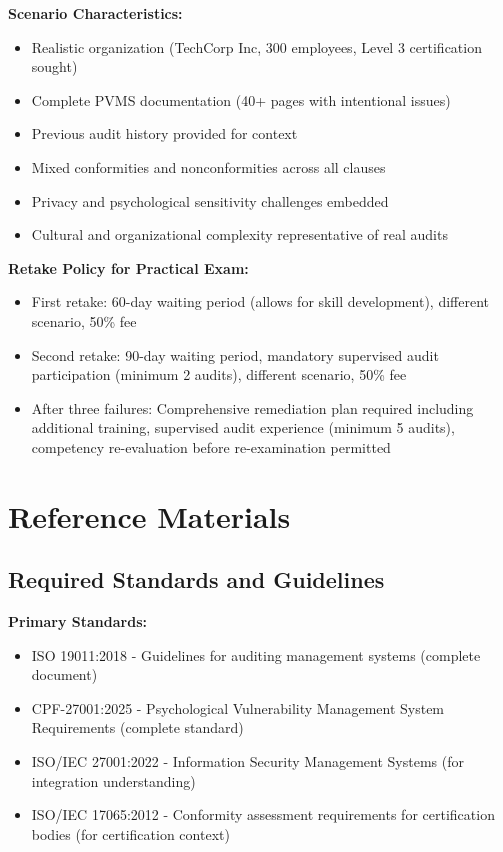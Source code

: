 \documentclass[11pt,a4paper]{article}
\begin{document}
\textbf{Scenario Characteristics:}
\begin{itemize}
\item Realistic organization (TechCorp Inc, 300 employees, Level 3 certification sought)
\item Complete PVMS documentation (40+ pages with intentional issues)
\item Previous audit history provided for context
\item Mixed conformities and nonconformities across all clauses
\item Privacy and psychological sensitivity challenges embedded
\item Cultural and organizational complexity representative of real audits
\end{itemize}

\textbf{Retake Policy for Practical Exam:}
\begin{itemize}
\item First retake: 60-day waiting period (allows for skill development), different scenario, 50\% fee
\item Second retake: 90-day waiting period, mandatory supervised audit participation (minimum 2 audits), different scenario, 50\% fee
\item After three failures: Comprehensive remediation plan required including additional training, supervised audit experience (minimum 5 audits), competency re-evaluation before re-examination permitted
\end{itemize}

\section{Reference Materials}

\subsection{Required Standards and Guidelines}

\textbf{Primary Standards:}
\begin{itemize}
\item ISO 19011:2018 - Guidelines for auditing management systems (complete document)
\item CPF-27001:2025 - Psychological Vulnerability Management System Requirements (complete standard)
\item ISO/IEC 27001:2022 - Information Security Management Systems (for integration understanding)
\item ISO/IEC 17065:2012 - Conformity assessment requirements for certification bodies (for certification context)
\end{itemize}
\end{document}

